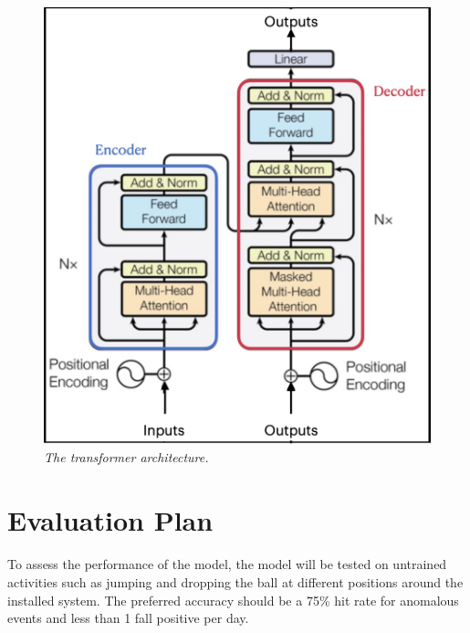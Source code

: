 \begin{figure}[H]
  \centering
  \caption[The transformer architecture.]{\emph{The transformer architecture. \\}}\label{fig:transformer_metho}
  \includegraphics[scale = 0.2]{figures/transformer_metho2.jpg}  
\end{figure}

\section{Evaluation Plan}
\paragraph{}
To assess the performance of the model, the model will be tested on untrained activities such as jumping and dropping the ball at different positions around the installed system. The preferred accuracy should be a 75\% hit rate for anomalous events and less than 1 fall positive per day.

\FloatBarrier